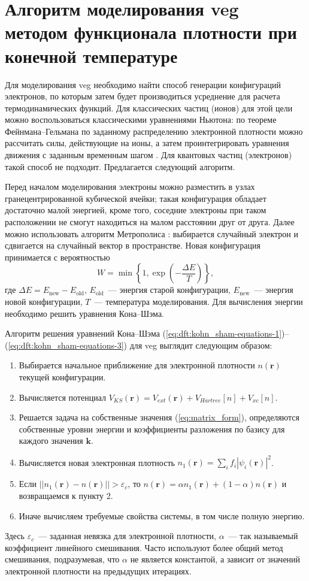 \section{Алгоритм моделирования \texorpdfstring{\acrshort{veg}}{ВЭГ} методом функционала плотности при конечной температуре}

Для моделирования \acrshort{veg} необходимо найти способ генерации конфигураций электронов, по которым затем будет производиться усреднение для расчета термодинамических функций. Для классических частиц (ионов) для этой цели можно воспользоваться классическими уравнениями Ньютона: по теореме Фейнмана--Гельмана по заданному распределению электронной плотности можно рассчитать силы, действующие на ионы, а затем проинтегрировать уравнения движения с заданным временным шагом \cite{Martin:book:2004}. Для квантовых частиц (электронов) такой способ не подходит. Предлагается следующий алгоритм.

Перед началом моделирования электроны можно разместить в узлах гранецентрированной кубической ячейки; такая конфигурация обладает достаточно малой энергией, кроме того, соседние электроны при таком расположении не смогут находиться на малом расстоянии друг от друга. Далее можно использовать алгоритм Метрополиса \cite{Zamalin:book:1977}: выбирается случайный электрон и сдвигается на случайный вектор в пространстве. Новая конфигурация принимается с вероятностью
%
\begin{equation}
    W = \min\left\{1, \exp(-\frac{\Delta E}{T}) \right\},
\end{equation}
%
где $\Delta E = E_\text{new} - E_\text{old}$, $E_\text{old}$~--- энергия старой конфигурации, $E_\text{new}$~--- энергия новой конфигурации, $T$~--- температура моделирования. Для вычисления энергии необходимо решить уравнения Кона--Шэма.

Алгоритм решения уравнений Кона--Шэма (\ref{eq:dft:kohn_sham-equations-1})--(\ref{eq:dft:kohn_sham-equations-3}) для \acrshort{veg} выглядит следующим образом:

\begin{enumerate}
    \item Выбирается начальное приближение для электронной плотности $n(\mathbf{r})$ текущей конфигурации.
    \item Вычисляется потенциал $V_{KS}(\mathbf{r}) = V_{ext}(\mathbf{r}) + V_{Hartree}[n] + V_{xc}[n]$.
    \item Решается задача на собственные значения (\ref{eq:matrix_form}), определяются собственные уровни энергии и коэффициенты разложения по базису для каждого значения $\mathbf{k}$.
    \item Вычисляется новая электронная плотность $n_1(\mathbf{r}) = \sum_i f_i|\psi_i(\mathbf{r})|^2$.
    \item Если $||n_1(\mathbf{r}) - n(\mathbf{r})|| > \varepsilon_c$, то $n(\mathbf{r}) = \alpha n_1(\mathbf{r}) + (1 - \alpha) n(\mathbf{r})$ и возвращаемся к пункту 2.
    \item Иначе вычисляем требуемые свойства системы, в том числе полную энергию.
\end{enumerate}

Здесь $\varepsilon_c$~--- заданная невязка для электронной плотности, $\alpha$~--- так называемый коэффициент линейного смешивания. Часто используют более общий метод смешивания, подразумевая, что $\alpha$ не является константой, а зависит от значений электронной плотности на предыдущих итерациях.